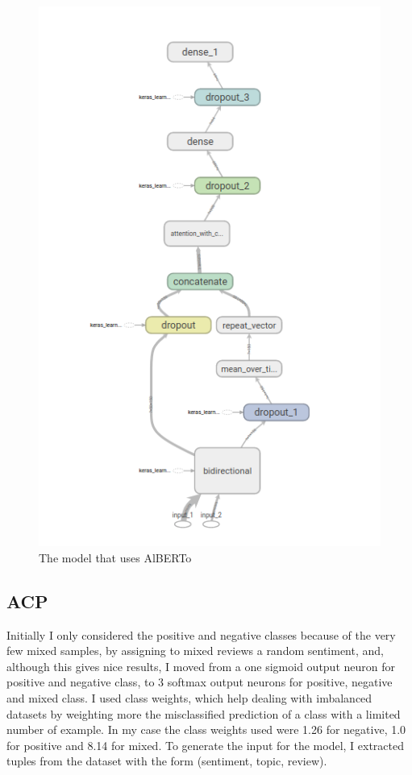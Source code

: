 \documentclass{article}
\begin{document}
            \begin{figure}
            \includegraphics[width=\linewidth]{alberto_model.png}
            \caption{The model that uses AlBERTo}
            \label{fig:alberto_model}
        \end{figure}

        \subsection{ACP}\label{subsec:s1}
            Initially I only considered the positive and negative classes because of the very few mixed samples, by assigning to
            mixed reviews a random sentiment, and, although this gives nice results, I moved from a one sigmoid output neuron for
            positive and negative class, to 3 softmax output neurons for positive, negative and mixed class.
            I used class weights, which help dealing with imbalanced datasets by weighting more the misclassified prediction of a class
            with a limited number of example.
            In my case the class weights used were 1.26 for negative, 1.0 for positive and 8.14 for mixed.
            To generate the input for the model, I extracted tuples from the dataset with the form (sentiment, topic, review).
\end{document}
